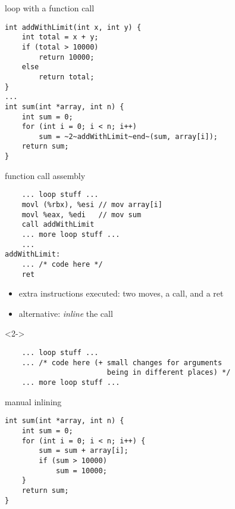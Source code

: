 \begin{frame}[fragile,label=inliningMot]{loop with a function call}
\begin{lstlisting}
int addWithLimit(int x, int y) {
    int total = x + y;
    if (total > 10000)
        return 10000;
    else
        return total;
}
...
int sum(int *array, int n) {
    int sum = 0;
    for (int i = 0; i < n; i++)
        sum = ~2~addWithLimit~end~(sum, array[i]);
    return sum;
}
\end{lstlisting}
\end{frame}

\begin{frame}[fragile,label=inlining]{function call assembly}
\begin{lstlisting}
    ... loop stuff ...
    movl (%rbx), %esi // mov array[i]
    movl %eax, %edi   // mov sum
    call addWithLimit
    ... more loop stuff ...
    ...
addWithLimit:
    ... /* code here */
    ret
\end{lstlisting}
    \begin{itemize}
        \item extra instructions executed: two moves, a call, and a ret
        \item<2-> alternative: \textit{inline} the call
    \end{itemize}
\begin{visibleenv}<2->
\begin{lstlisting}
    ... loop stuff ...
    ... /* code here (+ small changes for arguments
                        being in different places) */
    ... more loop stuff ...
\end{lstlisting}
\end{visibleenv}
\end{frame}

\begin{frame}[fragile,label=manualInlining]{manual inlining}
\begin{lstlisting}
int sum(int *array, int n) {
    int sum = 0;
    for (int i = 0; i < n; i++) {
        sum = sum + array[i];
        if (sum > 10000)
            sum = 10000;
    }
    return sum;
}

\end{lstlisting}
\end{frame}


